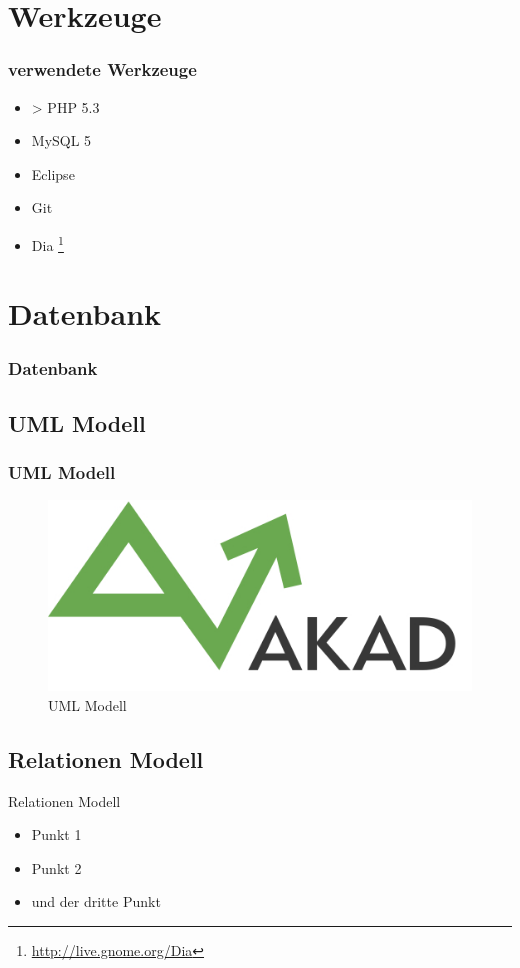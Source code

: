 \documentclass[xcolor=dvipsnames]{beamer}
\begin{document}
\section{Werkzeuge}
\begin{frame} %
  \frametitle{verwendete Werkzeuge} %
  \begin{block}{}
	  \begin{itemize}
  		\item > PHP 5.3
		\item MySQL 5
  		\item Eclipse
  		\item Git
  		\item Dia \footnote{\url{http://live.gnome.org/Dia}}
	  \end{itemize}
  \end{block}  
\end{frame}


\section{Datenbank}
\begin{frame} %
  \frametitle{Datenbank} %
\end{frame}


\subsection{UML Modell}
\begin{frame} %
  \frametitle{UML Modell} %
  	\begin{figure}
	   \includegraphics[scale=0.4]{akad_logo.png}
		\caption{UML Modell}
	\end{figure}
\end{frame}

\subsection{Relationen Modell}
\begin{frame} %
\begin{block}{Relationen Modell}		
	\begin{itemize}[]
		\item Punkt 1
		\item Punkt 2
		\item und der dritte Punkt
	\end{itemize}
\end{block}
\end{frame}
\end{document}
